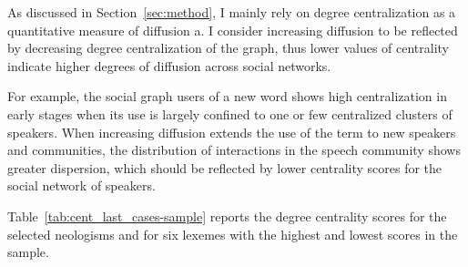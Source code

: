 \documentclass[
  a4paper,
  abstract=on,
  captions=tableabove
  ]{scrartcl}
\begin{document}
      As discussed in Section~\ref{sec:method}, I mainly rely on degree centralization as a quantitative measure of diffusion a. I consider increasing diffusion to be reflected by decreasing degree centralization of the graph, thus lower values of centrality indicate higher degrees of diffusion across social networks.

      For example, the social graph users of a new word shows high centralization in early stages when its use is largely confined to one or few centralized clusters of speakers. When increasing diffusion extends the use of the term to new speakers and communities, the distribution of interactions in the speech community shows greater dispersion, which should be reflected by lower centrality scores for the social network of speakers.

      Table~\ref{tab:cent_last_cases-sample} reports the degree centrality scores for the selected neologisms and for six lexemes with the highest and lowest scores in the sample.
\end{document}
